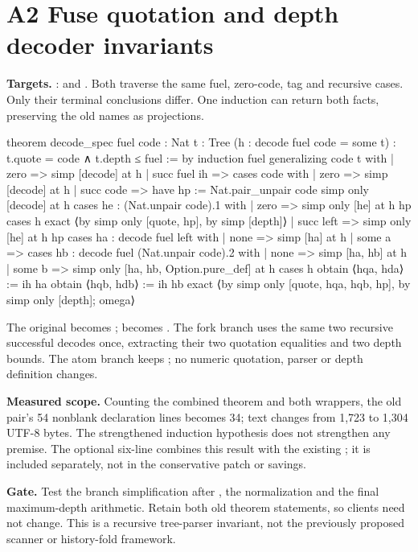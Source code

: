 \section{A2 Fuse quotation and depth decoder invariants}
\label{sec:decoder}

\textbf{Targets.} :
 and .
Both traverse the same fuel, zero-code, tag and recursive 
cases. Only their terminal conclusions differ. One induction can return
both facts, preserving the old names as projections.

\begin{Lean}
theorem decode_spec {fuel code : Nat} {t : Tree}
    (h : decode fuel code = some t) :
    t.quote = code ∧ t.depth ≤ fuel := by
  induction fuel generalizing code t with
  | zero => simp [decode] at h
  | succ fuel ih =>
    cases code with
    | zero => simp [decode] at h
    | succ code =>
      have hp := Nat.pair_unpair code
      simp only [decode] at h
      cases he : (Nat.unpair code).1 with
      | zero =>
        simp only [he] at h hp
        cases h
        exact ⟨by simp only [quote, hp], by simp [depth]⟩
      | succ left =>
        simp only [he] at h hp
        cases ha : decode fuel left with
        | none => simp [ha] at h
        | some a =>
          cases hb : decode fuel (Nat.unpair code).2 with
          | none => simp [ha, hb] at h
          | some b =>
            simp only [ha, hb, Option.pure_def] at h
            cases h
            obtain ⟨hqa, hda⟩ := ih ha
            obtain ⟨hqb, hdb⟩ := ih hb
            exact ⟨by simp only [quote, hqa, hqb, hp],
              by simp only [depth]; omega⟩
\end{Lean}

The original  becomes ;
 becomes . The fork branch
uses the same two recursive successful decodes once, extracting their two
quotation equalities and two depth bounds. The atom branch keeps
; no numeric quotation, parser or depth definition changes.

\textbf{Measured scope.} Counting the combined theorem and both wrappers,
the old pair's 54 nonblank declaration lines becomes 34; text changes from
1,723 to 1,304 UTF-8 bytes. The strengthened induction hypothesis does not
strengthen any premise. The optional six-line
 combines this result with the existing
; it is included separately, not in the conservative
patch or savings.

\textbf{Gate.} Test the branch simplification after , the
 normalization and the final maximum-depth arithmetic.
Retain both old theorem statements, so clients need not change. This is a
recursive tree-parser invariant, not the previously proposed scanner or
history-fold framework.
